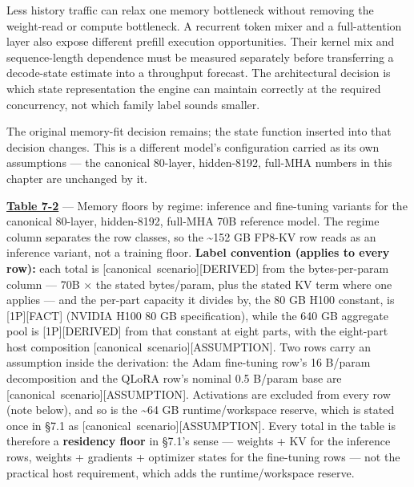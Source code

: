 Less history traffic can relax one memory bottleneck without removing
the weight-read or compute bottleneck. A recurrent token mixer and a
full-attention layer also expose different prefill execution
opportunities. Their kernel mix and sequence-length dependence must be
measured separately before transferring a decode-state estimate into a
throughput forecast. The architectural decision is which state
representation the engine can maintain correctly at the required
concurrency, not which family label sounds smaller.

The original memory-fit decision remains; the state function inserted
into that decision changes. This is a different model's configuration
carried as its own assumptions --- the canonical 80-layer, hidden-8192,
full-MHA numbers in this chapter are unchanged by it.


\textbf{\hyperref[tab:7.2]{Table 7-2}} --- Memory floors by regime: inference and
fine-tuning variants for the canonical 80-layer, hidden-8192, full-MHA
70B reference model. The regime column separates the row classes, so the
\textasciitilde152 GB FP8-KV row reads as an inference variant, not a
training floor. \textbf{Label convention (applies to every row):} each
total is \mbox{{[}canonical scenario{]}}\hspace{0pt}\mbox{{[}DERIVED{]}} from the bytes-per-param
column --- 70B × the stated bytes/param, plus the stated KV term where
one applies --- and the per-part capacity it divides by, the 80 GB H100
constant, is \mbox{{[}1P{]}}\hspace{0pt}\mbox{{[}FACT{]}} (NVIDIA H100 80 GB specification), while
the 640 GB aggregate pool is \mbox{{[}1P{]}}\hspace{0pt}\mbox{{[}DERIVED{]}} from that constant at
eight parts, with the eight-part host composition \mbox{{[}canonical
scenario{]}}\hspace{0pt}\mbox{{[}ASSUMPTION{]}}. Two rows carry an assumption inside the
derivation: the Adam fine-tuning row's 16 B/param decomposition and the
QLoRA row's nominal 0.5 B/param base are \mbox{{[}canonical
scenario{]}}\hspace{0pt}\mbox{{[}ASSUMPTION{]}}. Activations are excluded from every row
(note below), and so is the \textasciitilde64 GB runtime/workspace
reserve, which is stated once in §7.1 as \mbox{{[}canonical
scenario{]}}\hspace{0pt}\mbox{{[}ASSUMPTION{]}}. Every total in the table is therefore a
\textbf{residency floor} in §7.1's sense --- weights + KV for the
inference rows, weights + gradients + optimizer states for the
fine-tuning rows --- not the practical host requirement, which adds the
runtime/workspace reserve.

